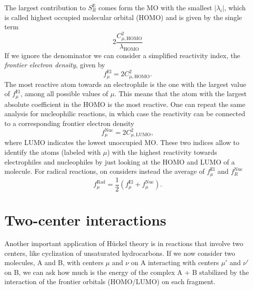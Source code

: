 \documentclass[../Main/chem532-notes.tex]{subfiles}
\begin{document}
The largest contribution to $S_R^\mathrm{E}$ comes form the MO with the smallest $|\lambda_i|$, which is called highest occupied molecular orbital (HOMO) and is given by the single term
\begin{equation}
2\frac{C_{\mu,\mathrm{HOMO}}^2}{\lambda_\mathrm{HOMO}}
\end{equation}
If we ignore the denominator we can consider a simplified reactivity index, the \textit{frontier electron density}, given by
\begin{equation}
f_\mu^\mathrm{El} = 2 C_{\mu,\mathrm{HOMO}}^2.
\end{equation}
The most reactive atom towards an electrophile is the one with the largest value of $f_\mu^\mathrm{El}$, among all possible values of $\mu$.
This means that the atom with the largest absolute coefficient in the HOMO is the most reactive.
One can repeat the same analysis for nucleophilic reactions, in which case the reactivity can be connected to a corresponding frontier electron density
\begin{equation}
f_\mu^\mathrm{Nuc} = 2 C_{\mu,\mathrm{LUMO}}^2,
\end{equation}
where LUMO indicates the lowest unoccupied MO.
These two indices allow to identify the atoms (labeled with $\mu$) with the highest reactivity towards electrophiles and nucleophiles by just looking at the HOMO and LUMO of a molecule.
For radical reactions, on considers instead the average of $f_\mu^\mathrm{El}$ and $f_R^\mathrm{Nuc}$
\begin{equation}
f_\mu^\mathrm{Rad} = \frac{1}{2} ( f_\mu^\mathrm{El} + f_\mu^\mathrm{Nuc} ).
\end{equation}

\section{Two-center interactions}
Another important application of H\"{u}ckel theory is in reactions that involve two centers, like cyclization of unsaturated hydrocarbons.
If we now consider two molecules, A and B, with centers $\mu$ and $\nu$ on A interacting with centers $\mu'$ and $\nu'$ on B, we can ask how much is the energy of the complex A + B stabilized by the interaction of the frontier orbitals (HOMO/LUMO) on each fragment.
\begin{center}
\end{center}
\end{document}
